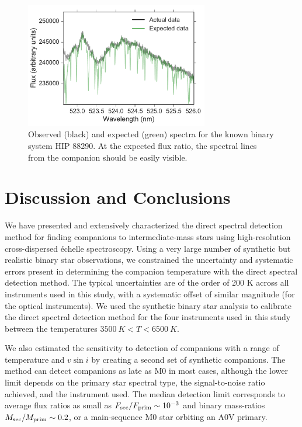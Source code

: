 \documentclass{emulateapj}
\begin{document}
\begin{figure}
        \centering
        \includegraphics[width= 80mm]{HIP_88290_Flux.pdf}
         \caption{Observed (black) and expected (green) spectra for the known binary system HIP 88290. At the expected flux ratio, the spectral lines from the companion should be easily visible. }
         \label{fig:expected}
\end{figure}

\section{Discussion and Conclusions}
\label{sec:conclusions}
We have presented and extensively characterized the direct spectral detection method for finding companions to intermediate-mass stars using high-resolution cross-dispersed \'echelle spectroscopy. Using a very large number of synthetic but realistic binary star observations, we constrained the uncertainty and systematic errors present in determining the companion temperature with the direct spectral detection method. The typical uncertainties are of the order of 200 K across all instruments used in this study, with a systematic offset of similar magnitude (for the optical instruments). We used the synthetic binary star analysis to calibrate the direct spectral detection method for the four instruments used in this study between the temperatures $ 3500\ K < T < 6500\ K$.

We also estimated the sensitivity to detection of companions with a range of temperature and $v\sin{i}$ by creating a second set of synthetic companions. The method can detect companions as late as M0 in most cases, although the lower limit depends on the primary star spectral type, the signal-to-noise ratio achieved, and the instrument used. The median detection limit corresponds to average flux ratios as small as $F_{\rm  sec}/F_{\rm prim} \sim 10^{-3}$ and binary mass-ratios $M_{\rm  sec}/M_{\rm prim} \sim 0.2$, or a main-sequence M0 star orbiting an A0V primary.
\end{document}
